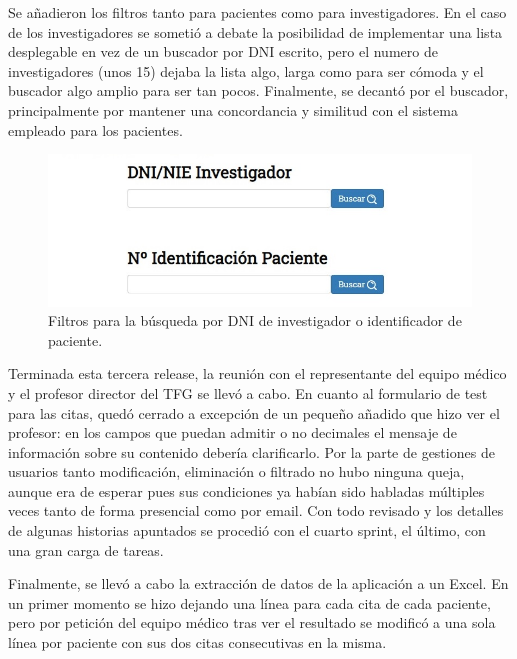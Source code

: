 Se añadieron los filtros tanto para pacientes como para investigadores. En el caso de los investigadores se sometió a debate la posibilidad de implementar una lista desplegable en vez de un buscador por DNI escrito, pero el numero de investigadores (unos 15) dejaba la lista algo, larga como para ser cómoda y el buscador algo amplio para ser tan pocos. Finalmente, se decantó por el buscador, principalmente por mantener una concordancia y similitud con el sistema empleado para los pacientes.

\begin{figure}[h]
    \centering
     \includegraphics[width=1\textwidth]{images/filtros.jpg}
    \caption{Filtros para la búsqueda por DNI de investigador o identificador de paciente.}
\end{figure}

Terminada esta tercera release, la reunión con el representante del equipo médico y el profesor director del TFG se llevó a cabo. En cuanto al formulario de test para las citas, quedó cerrado a excepción de un pequeño añadido que hizo ver el profesor: en los campos que puedan admitir o no decimales el mensaje de información sobre su contenido debería clarificarlo. Por la parte de gestiones de usuarios tanto modificación, eliminación o filtrado no hubo ninguna queja, aunque era de esperar pues sus condiciones ya habían sido habladas múltiples veces tanto de forma presencial como por email. Con todo revisado y los detalles de algunas historias apuntados se procedió con el cuarto sprint, el último, con una gran carga de tareas.
\newline

Finalmente, se llevó a cabo la extracción de datos de la aplicación a un Excel. En un primer momento se hizo dejando una línea para cada cita de cada paciente, pero por petición del equipo médico tras ver el resultado se modificó a una sola línea por paciente con sus dos citas consecutivas en la misma.

